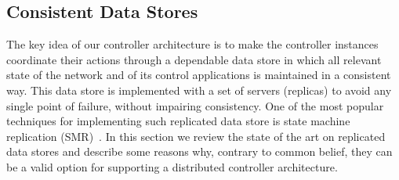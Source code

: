 \documentclass[12pt,openright,twoside]{report}
\begin{document}
\begin{itemize}




\section{Consistent Data Stores}
\glsresetall
\label{sec:relatedWork:consistentDataStore}
The key idea of our controller architecture is to make the controller instances coordinate their actions through a dependable data store in which all relevant state of the network and of its control applications is maintained in a consistent way.
This data store is implemented with a set of servers (replicas) to avoid any single point of failure, without impairing consistency.
One of the most popular techniques for implementing such replicated data store is state machine replication (SMR)~\cite{Sch90,Lam98}.
In this section we review the state of the art on replicated data stores and describe some reasons why, contrary to common belief, they can be a valid option for supporting a distributed controller architecture.


\end{itemize}
\end{document}
